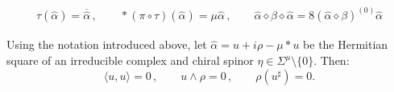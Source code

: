 \documentclass[10pt,a4paper]{amsart}
\newcommand{\escal}[1]{\langle#1\rangle}
\begin{document}
\begin{eqnarray}
\label{eq:sesquilinear6d}
\tau(\widehat{\alpha})=\overline{\widehat{\alpha}}\, ,\qquad   \ast (\pi\circ\tau)(\widehat{\alpha}) =   \mu\widehat{\alpha}\, , \qquad \widehat{\alpha} \diamond \beta \diamond\widehat{\alpha}= 8 (\widehat{\alpha}\diamond\beta)^{(0)}\widehat{\alpha}
\end{eqnarray}

\begin{lemma}
Using the notation introduced above, let $\widehat{\alpha} = u + i \rho  - \mu \ast u$ be the Hermitian square of an irreducible complex and chiral spinor $\eta\in \Sigma^{\mu}\setminus \{ 0 \}$. Then:
\begin{equation*}
\escal{u,u}= 0 \, , \qquad u\wedge \rho = 0\, , \qquad \rho(u^\sharp) = 0.
\end{equation*}
\end{lemma}
\end{document}
